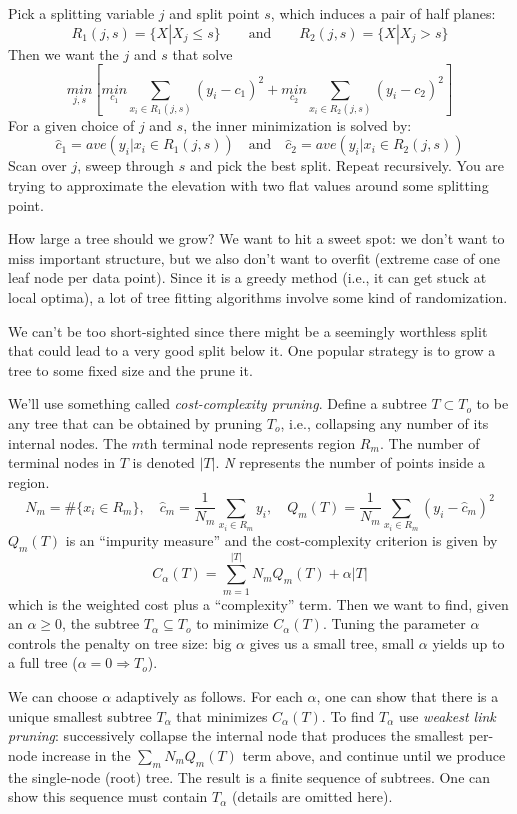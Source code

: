 \documentclass[a4paper]{article}
\begin{document}
Pick a splitting variable $j$ and split point $s$, which induces a pair of half planes:
$$
R_1(j,s) = \{{X} | X_j \leq s\} \qquad \text{and} \qquad R_2(j,s) = \{{X}|X_j > s\}
$$
Then we want the $j$ and $s$ that solve
$$
\underset{j,s}{min} \left[\underset{c_1}{min} \sum_{{x_i} \in R_1(j,s)} (y_i-c_1)^2 + \underset{c_2}{min} \sum_{{x_i} \in R_2(j,s)} (y_i - c_2)^2\right]
$$
For a given choice of $j$ and $s$, the inner minimization is solved by:
$$
\hat{c}_1 = ave(y_i | {x_i} \in R_1(j,s)) \quad \text{and} \quad \hat{c}_2 = ave(y_i | {x_i} \in R_2(j,s))
$$
Scan over $j$, sweep through $s$ and pick the best split.  Repeat recursively. You are trying to approximate the elevation with two flat values around some splitting point.

How large a tree should we grow?  We want to hit a sweet spot: we don't want to miss important structure, but we also don't want to overfit (extreme case of one leaf node per data point).  Since it is a greedy method (i.e., it can get stuck at local optima), a lot of tree fitting algorithms involve some kind of randomization.

We can't be too short-sighted since there might be a seemingly worthless split that could lead to a very good split below it.  One popular strategy is to grow a tree to some fixed size and the prune it.  

We'll use something called \emph{cost-complexity pruning}.  Define a subtree $T \subset T_o$ to be any tree that can be obtained by pruning $T_o$, i.e., collapsing any number of its internal nodes.  The $m$th terminal node represents region $R_m$.  The number of terminal nodes in $T$ is denoted $\left\vert T\right\vert$.  \textit{N} represents the number of points inside a region.
$$
N_m = \# \{{x_i} \in R_m\}, \quad \hat{c}_m = \frac{1}{N_m} \sum_{{x_i} \in R_m} y_i, \quad Q_m(T) = \frac{1}{N_m} \sum_{{x_i} \in R_m} (y_i - \hat{c}_m)^2
$$
$Q_m(T)$ is an ``impurity measure'' and the cost-complexity criterion is given by
$$
C_\alpha(T) = \sum_{m=1}^{\left\vert T \right\vert} N_m Q_m(T) + \alpha \left\vert T \right\vert
$$
which is the weighted cost plus a ``complexity'' term.  Then we want to find, given an $\alpha \geq 0$, the subtree $T_\alpha \subseteq T_o$ to minimize $C_\alpha(T)$.  Tuning the parameter $\alpha$ controls the penalty on tree size:
big $\alpha$ gives us a small tree, small $\alpha$ yields up to a full tree ($\alpha = 0 \Rightarrow T_o$). 

We can choose $\alpha$ adaptively as follows.
For each $\alpha$, one can show that there is a unique smallest subtree $T_\alpha$ that minimizes $C_\alpha(T)$.
To find $T_\alpha$ use \emph{weakest link pruning}: successively collapse the internal node that produces the smallest per-node increase in the $\sum_m N_m Q_m(T)$ term above, and continue until we produce the single-node (root) tree.  The result is a finite sequence of subtrees.  One can show this sequence must contain $T_\alpha$ (details are omitted here).
\end{document}
